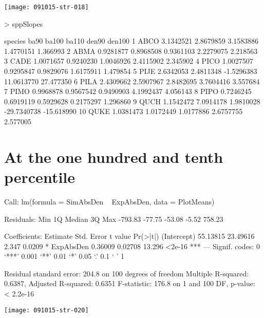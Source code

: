 \documentclass{article}
\begin{document}
\texttt{[image: 091015-str-018]}
\begin{Schunk}
\begin{Sinput}
>   sppSlopes
\end{Sinput}
\begin{Soutput}
   species      ba90     ba100      ba110       den90     den100
1     ABCO 3.1342521 2.8679859  3.1583886   1.4770151   1.366993
2     ABMA 0.9281877 0.8968508  0.9361103   2.2279075   2.218563
3     CADE 1.0071657 0.9240230  1.0046926   2.4115902   2.345902
4     PICO 1.0027507 0.9295847  0.9829076   1.6175911   1.479854
5     PIJE 2.6342053 2.4811348 -1.5296383  11.0613770  27.477350
6     PILA 2.4309662 2.5907967  2.8482695   3.7604416   3.557684
7     PIMO 0.9968878 0.9567542  0.9490903   4.1992437   4.056143
8     PIPO 0.7246245 0.6919119  0.5929628   0.2175297   1.296860
9     QUCH 1.1542472 7.0914178  1.9810028 -29.7340738 -15.618990
10    QUKE 1.0381473 1.0172449  1.0177886   2.6757755   2.577005
\end{Soutput}
\end{Schunk}





\newpage
\section{At the one hundred and tenth percentile}
\begin{Schunk}
\begin{Soutput}
Call:
lm(formula = SimAbsDen ~ ExpAbsDen, data = PlotMeans)

Residuals:
    Min      1Q  Median      3Q     Max 
-793.83  -77.75  -53.08   -5.52  758.23 

Coefficients:
            Estimate Std. Error t value Pr(>|t|)    
(Intercept) 55.13815   23.49616   2.347   0.0209 *  
ExpAbsDen    0.36009    0.02708  13.296   <2e-16 ***
---
Signif. codes:  0 ‘***’ 0.001 ‘**’ 0.01 ‘*’ 0.05 ‘.’ 0.1 ‘ ’ 1

Residual standard error: 204.8 on 100 degrees of freedom
Multiple R-squared:  0.6387,	Adjusted R-squared:  0.6351 
F-statistic: 176.8 on 1 and 100 DF,  p-value: < 2.2e-16
\end{Soutput}
\end{Schunk}
\texttt{[image: 091015-str-020]}
\end{document}
